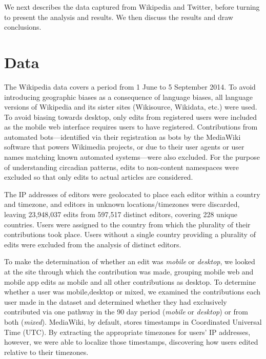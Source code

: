 \documentclass{sigchi}
\begin{document}
We next describes the data captured from Wikipedia and Twitter, before turning to present the analysis and results. We then discuss the results and draw conclusions.

\section{Data}

The Wikipedia data covers a period from 1 June to 5 September 2014. To avoid introducing geographic biases as a consequence of language biases, all language versions of Wikipedia and its sister sites (Wikisource, Wikidata, etc.) were used. To avoid biasing towards desktop, only edits from registered users were included as the mobile web interface requires users to have registered. Contributions from automated bots---identified via their registration as bots by the MediaWiki software that powers Wikimedia projects, or due to their user agents or user names matching known automated systems---were also excluded. For the purpose of understanding circadian patterns, edits to non-content namespaces were excluded so that only edits to actual articles are considered.

The IP addresses of editors were geolocated to place each editor within a country and timezone, and editors in unknown locations\slash{}timezones were discarded, leaving 23,948,037 edits from 597,517 distinct editors, covering 228 unique countries.
Users were assigned to the country from which the plurality of their contributions took place. Users without a single country providing a plurality of edits were excluded from the analysis of distinct editors.


To make the determination of whether an edit was \emph{mobile} or \emph{desktop}, we looked at the site through which the contribution was made, grouping mobile web and mobile app edits as mobile and all other contributions as desktop. To determine whether a user was mobile,desktop or mixed, we examined the contributions each user made in the dataset and determined whether they had exclusively contributed via one pathway in the 90 day period (\emph{mobile} or \emph{desktop}) or from both (\emph{mixed}).
MediaWiki, by default, stores timestamps in Coordinated Universal Time (UTC). By extracting the appropriate timezones for users' IP addresses, however, we were able to localize those timestamps, discovering how users edited relative to their timezones.%
\end{document}
